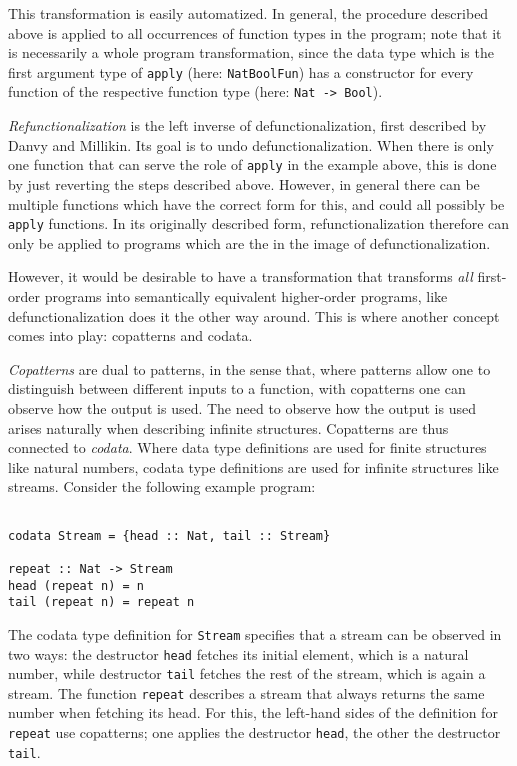 This transformation is easily automatized. In general, the procedure described above is applied to all occurrences of function types in the program; note that it is necessarily a whole program transformation, since the data type which is the first argument type of \texttt{apply} (here: \texttt{NatBoolFun}) has a constructor for every function of the respective function type (here: \texttt{Nat -> Bool}).

\textit{Refunctionalization} is the left inverse of defunctionalization, first described by Danvy and Millikin\cite{danvy09refunctionalization}. Its goal is to undo defunctionalization. When there is only one function that can serve the role of \texttt{apply} in the example above, this is done by just reverting the steps described above. However, in general there can be multiple functions which have the correct form for this, and could all possibly be \texttt{apply} functions. In its originally described form, refunctionalization therefore can only be applied to programs which are the in the image of defunctionalization.

However, it would be desirable to have a transformation that transforms \textit{all} first-order programs into semantically equivalent higher-order programs, like defunctionalization does it the other way around. This is where another concept comes into play: copatterns and codata.

\textit{Copatterns} are dual to patterns, in the sense that, where patterns allow one to distinguish between different inputs to a function, with copatterns one can observe how the output is used. The need to observe how the output is used arises naturally when describing infinite structures. Copatterns are thus connected to \textit{codata}. Where data type definitions are used for finite structures like natural numbers, codata type definitions are used for infinite structures like streams. Consider the following example program:

\begin{lstlisting}

codata Stream = {head :: Nat, tail :: Stream}

repeat :: Nat -> Stream
head (repeat n) = n
tail (repeat n) = repeat n

\end{lstlisting}

The codata type definition for \texttt{Stream} specifies that a stream can be observed in two ways: the destructor \texttt{head} fetches its initial element, which is a natural number, while destructor \texttt{tail} fetches the rest of the stream, which is again a stream. The function \texttt{repeat} describes a stream that always returns the same number when fetching its head. For this, the left-hand sides of the definition for \texttt{repeat} use copatterns; one applies the destructor \texttt{head}, the other the destructor \texttt{tail}.


